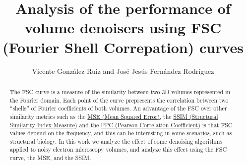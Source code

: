 \documentclass{article}
\title{Analysis of the performance of volume denoisers using FSC (Fourier Shell Correpation) curves}
\author{Vicente González Ruiz and José Jesús Fernández Rodríguez}
\begin{document}
\maketitle

\begin{abstract}
  The FSC curve is a measure of the similarity between two 3D volumes
  represented in the Fourier domain. Each point of the curve
  prepresents the correlation between two ``shells'' of Fourier
  coefficients of both volumes. An advantage of the FSC over other
  similarity metrics such as the
  \href{https://en.wikipedia.org/wiki/Mean_squared_error}{MSE (Mean
    Squared Error)}, the
  \href{https://en.wikipedia.org/wiki/Structural_similarity_index_measure}{SSIM
    (Structural Similarity Index Measure)} and the
  \href{https://en.wikipedia.org/wiki/Pearson_correlation_coefficient}{PPC
    (Pearson Correlation Coefficient)} is that FSC values depend on
  the frequency, and this can be interesting in some scenarios, such
  as structural biology. In this work we analyze the effect of some
  denoising algorithms applied to noisy electron microscopy volumes,
  and analyze this effect using the FSC curve, the MSE, and the SSIM.
\end{abstract}
\end{document}
